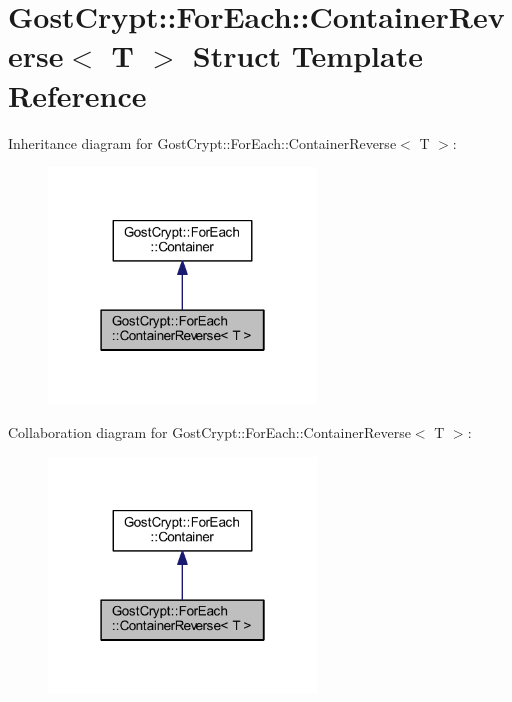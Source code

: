 \hypertarget{struct_gost_crypt_1_1_for_each_1_1_container_reverse}{}\section{Gost\+Crypt\+:\+:For\+Each\+:\+:Container\+Reverse$<$ T $>$ Struct Template Reference}
\label{struct_gost_crypt_1_1_for_each_1_1_container_reverse}


Inheritance diagram for Gost\+Crypt\+:\+:For\+Each\+:\+:Container\+Reverse$<$ T $>$\+:
\nopagebreak
\begin{figure}[H]
\begin{center}
\leavevmode
\includegraphics[width=202pt]{struct_gost_crypt_1_1_for_each_1_1_container_reverse__inherit__graph}
\end{center}
\end{figure}


Collaboration diagram for Gost\+Crypt\+:\+:For\+Each\+:\+:Container\+Reverse$<$ T $>$\+:
\nopagebreak
\begin{figure}[H]
\begin{center}
\leavevmode
\includegraphics[width=202pt]{struct_gost_crypt_1_1_for_each_1_1_container_reverse__coll__graph}
\end{center}
\end{figure}
